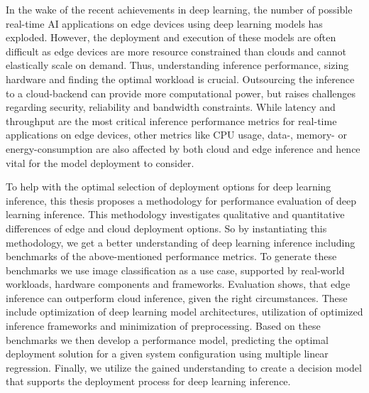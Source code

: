 \noindent In the wake of the recent achievements in deep learning, the number of possible real-time AI applications on edge devices using deep learning models has exploded.
However, the deployment and execution of these models are often difficult as edge devices are more resource constrained than clouds and cannot elastically scale on demand.
Thus, understanding inference performance, sizing hardware and finding the optimal workload is crucial.
Outsourcing the inference to a cloud-backend can provide more computational power, but raises challenges regarding security, reliability and bandwidth constraints. 
While latency and throughput are the most critical inference performance metrics for real-time applications on edge devices, other metrics like CPU usage, data-, memory- or energy-consumption are also affected by both cloud and edge inference and hence vital for the model deployment to consider.

To help with the optimal selection of deployment options for deep learning inference, this thesis proposes a methodology for performance evaluation of deep learning inference.
This methodology investigates qualitative and quantitative differences of edge and cloud deployment options.
So by instantiating this methodology, we get a better understanding of deep learning inference including benchmarks of the above-mentioned performance metrics.
To generate these benchmarks we use image classification as a use case, supported by real-world workloads, hardware components and frameworks.
Evaluation shows, that edge inference can outperform cloud inference, given the right circumstances.
These include optimization of deep learning model architectures, utilization of optimized inference frameworks and minimization of preprocessing.
Based on these benchmarks we then develop a performance model, predicting the optimal deployment solution for a given system configuration using multiple linear regression.
Finally, we utilize the gained understanding to create a decision model that supports the deployment process for deep learning inference.




